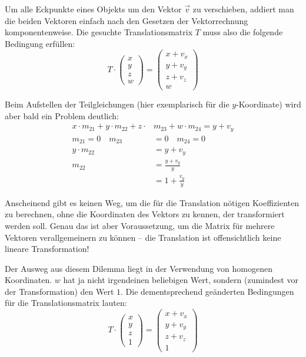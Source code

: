 Um alle Eckpunkte eines Objekts um den Vektor $\vec v$ zu verschieben, addiert man die beiden Vektoren einfach nach den Gesetzen der Vektorrechnung komponentenweise. Die gesuchte Translationsmatrix $T$ muss also die folgende Bedingung erfüllen:
\begin{equation}
 T \cdot 
 \begin{pmatrix}
  x \\
  y \\
  z \\
  w
 \end{pmatrix}
 =
 \begin{pmatrix}
  x + v_x \\
  y + v_y \\
  z + v_z \\
  w
 \end{pmatrix}
\end{equation}

Beim Aufstellen der Teilgleichungen (hier exemplarisch für die $y$-Koordinate) wird aber bald ein Problem deutlich:
\begin{equation}
\begin{split}
 x \cdot m_{21} + y \cdot m_{22} + z \cdot & m_{23} + w \cdot m_{24} = y + v_y \\
 m_{21} = 0 \quad m_{23} &= 0 \quad m_{24} = 0 \\
 y \cdot m_{22} & = y + v_y \\
 m_{22} & = \frac{y + v_y}{y} \\
 & = 1 + \frac{v_y}{y}
\end{split}
\end{equation}

Anscheinend gibt es keinen Weg, um die für die Translation nötigen Koeffizienten zu berechnen, ohne die Koordinaten des Vektors zu kennen, der transformiert werden soll. Genau das ist aber Voraussetzung, um die Matrix für mehrere Vektoren verallgemeinern zu können -- die Translation ist offensichtlich keine lineare Transformation!

Der Ausweg aus diesem Dilemma liegt in der Verwendung von homogenen Koordinaten. $w$ hat ja nicht irgendeinen beliebigen Wert, sondern (zumindest vor der Transformation) den Wert $1$. Die dementsprechend geänderten Bedingungen für die Translationsmatrix lauten:
\begin{equation}
 T \cdot 
 \begin{pmatrix}
  x \\
  y \\
  z \\
  1
 \end{pmatrix}
 =
 \begin{pmatrix}
  x + v_x \\
  y + v_y \\
  z + v_z \\
  1
 \end{pmatrix}
\end{equation}

